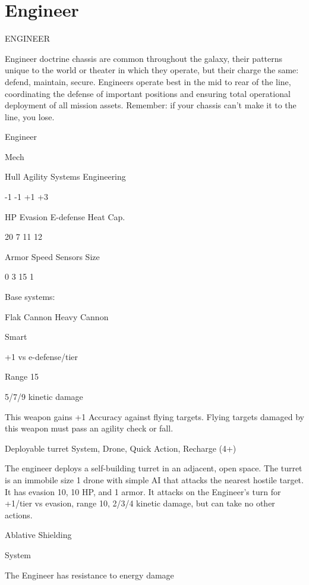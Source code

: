 \section{Engineer}
                                              ENGINEER

Engineer doctrine chassis are common throughout the galaxy, their patterns unique to the world
or theater in which they operate, but their charge the same: defend, maintain, secure. Engineers
operate best in the mid to rear of the line, coordinating the defense of important positions and
ensuring total operational deployment of all mission assets. Remember: if your chassis can’t
make it to the line, you lose.


 Engineer

 Mech

 Hull       Agility      Systems       Engineering

 -1         -1           +1            +3

 HP         Evasion      E-defense     Heat Cap.

 20         7            11            12

 Armor      Speed        Sensors       Size

 0          3            15            1

Base systems:

Flak Cannon
Heavy Cannon

Smart

+1 vs e-defense/tier

Range 15

5/7/9 kinetic damage

This weapon gains +1 Accuracy against flying targets. Flying targets damaged by this weapon
must pass an agility check or fall.


Deployable turret
System, Drone, Quick Action, Recharge (4+)

The engineer deploys a self-building turret in an adjacent, open space. The turret is an immobile
size 1 drone with simple AI that attacks the nearest hostile target. It has evasion 10, 10 HP, and 1
armor. It attacks on the Engineer’s turn for +1/tier vs evasion, range 10, 2/3/4 kinetic damage,
but can take no other actions.


Ablative Shielding

System

The Engineer has resistance to energy damage





